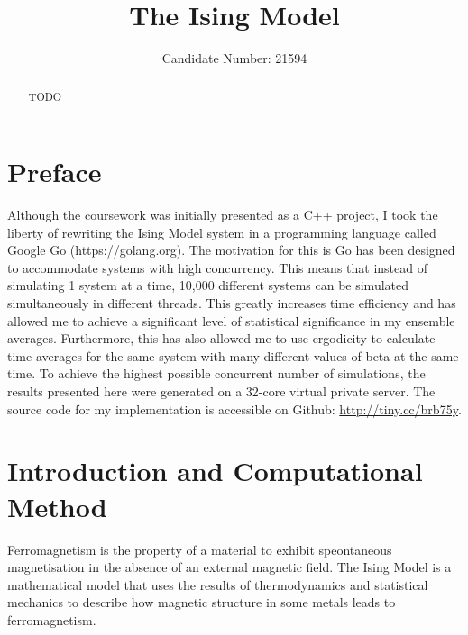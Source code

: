 \documentclass[11pt]{iopart}
\begin{document}
\setlength{\marginparwidth}{1.5cm}

\title[]{The Ising Model}

\author{Candidate Number: 21594}

\address{Department of Physics,
University of Bath, Bath BA2 7AY, United Kingdom}
\begin{abstract}
TODO
\end{abstract}



\section*{Preface}
Although the coursework was initially presented as a C++ project, I took the liberty of rewriting the Ising Model system in a programming language called Google Go (https://golang.org). The motivation for this is Go has been designed to accommodate systems with high concurrency. This means that instead of simulating 1 system at a time, 10,000 different systems can be simulated simultaneously in different threads. This greatly increases time efficiency and has allowed me to achieve a significant level of statistical significance in my ensemble averages. Furthermore, this has also allowed me to use ergodicity to calculate time averages for the same system with many different values of beta at the same time. To achieve the highest possible concurrent number of simulations, the results presented here were generated on a 32-core virtual private server. The source code for my implementation is accessible on Github: \url{http://tiny.cc/brb75y}.

\section{Introduction and Computational Method}
Ferromagnetism is the property of a material to exhibit speontaneous magnetisation in the absence of an external magnetic field. The Ising Model is a mathematical model that uses the results of thermodynamics and statistical mechanics to describe how magnetic structure in some metals leads to ferromagnetism.
\end{document}
